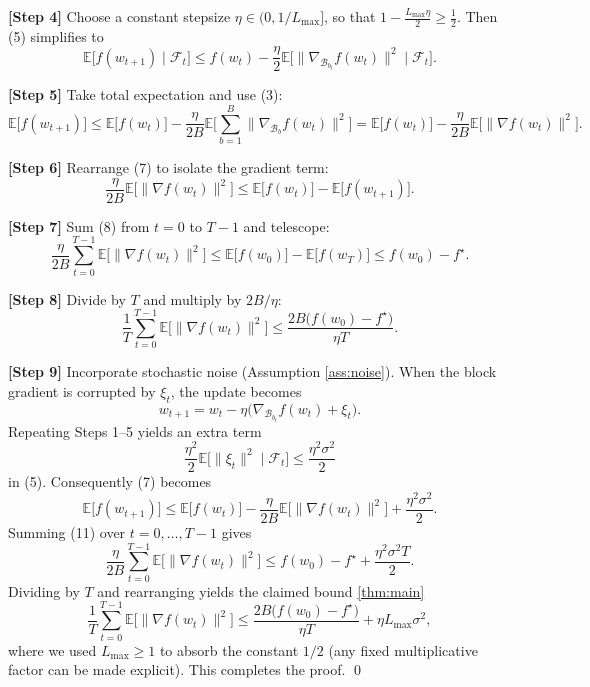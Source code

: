 \documentclass[11pt]{article}
\newcommand{\EE}{\mathbb{E}}
\newcommand{\grad}{\nabla}
\newcommand{\block}[1]{\mathcal{B}_{#1}}
\begin{document}
\noindent\textbf{[Step 4]}  Choose a constant stepsize $\eta\in(0,1/L_{\max}]$,
so that $1-\frac{L_{\max}\eta}{2}\ge\frac12$.  Then (5) simplifies to
\[
\EE\!\big[ f(w_{t+1})\mid\mathcal{F}_t\big]
\le
f(w_t) - \frac{\eta}{2}
\EE\!\big[ \big\|\grad_{\block{b_t}} f(w_t)\big\|^2 \mid \mathcal{F}_t\big].
\tag{6}
\]

\noindent\textbf{[Step 5]}  Take total expectation and use (3):
\[
\EE\!\big[ f(w_{t+1})\big]
\le
\EE\!\big[ f(w_t)\big]
- \frac{\eta}{2B}
\EE\!\big[ \sum_{b=1}^{B}\big\|\grad_{\block{b}} f(w_t)\big\|^2\big]
=
\EE\!\big[ f(w_t)\big]
- \frac{\eta}{2B}
\EE\!\big[ \|\grad f(w_t)\|^2\big].
\tag{7}
\]

\noindent\textbf{[Step 6]}  Rearrange (7) to isolate the gradient term:
\[
\frac{\eta}{2B}\EE\!\big[ \|\grad f(w_t)\|^2\big]
\le
\EE\!\big[ f(w_t)\big] - \EE\!\big[ f(w_{t+1})\big].
\tag{8}
\]

\noindent\textbf{[Step 7]}  Sum (8) from $t=0$ to $T-1$ and telescope:
\[
\frac{\eta}{2B}\sum_{t=0}^{T-1}\EE\!\big[ \|\grad f(w_t)\|^2\big]
\le
\EE\!\big[ f(w_0)\big] - \EE\!\big[ f(w_T)\big]
\le
f(w_0)-f^\star .
\tag{9}
\]

\noindent\textbf{[Step 8]}  Divide by $T$ and multiply by $2B/\eta$:
\[
\frac{1}{T}\sum_{t=0}^{T-1}\EE\!\big[ \|\grad f(w_t)\|^2\big]
\le
\frac{2B\big(f(w_0)-f^\star\big)}{\eta T}.
\tag{10}
\]

\noindent\textbf{[Step 9]}  Incorporate stochastic noise (Assumption \ref{ass:noise}).
When the block gradient is corrupted by $\xi_t$, the update becomes
\[
w_{t+1}=w_t - \eta\big(\grad_{\block{b_t}} f(w_t)+\xi_t\big).
\]
Repeating Steps 1–5 yields an extra term
\[
\frac{\eta^{2}}{2}\EE\!\big[\|\xi_t\|^2\mid\mathcal{F}_t\big]
\le \frac{\eta^{2}\sigma^{2}}{2}
\]
in (5).  Consequently (7) becomes
\[
\EE\!\big[ f(w_{t+1})\big]
\le
\EE\!\big[ f(w_t)\big]
- \frac{\eta}{2B}\EE\!\big[ \|\grad f(w_t)\|^2\big]
+ \frac{\eta^{2}\sigma^{2}}{2}.
\tag{11}
\]
Summing (11) over $t=0,\dots ,T-1$ gives
\[
\frac{\eta}{2B}\sum_{t=0}^{T-1}\EE\!\big[ \|\grad f(w_t)\|^2\big]
\le
f(w_0)-f^\star + \frac{\eta^{2}\sigma^{2}T}{2}.
\tag{12}
\]
Dividing by $T$ and rearranging yields the claimed bound \eqref{thm:main}
\[
\frac{1}{T}\sum_{t=0}^{T-1}\EE\!\big[ \|\grad f(w_t)\|^2\big]
\le
\frac{2B\big(f(w_0)-f^\star\big)}{\eta T}
+ \eta L_{\max}\sigma^{2},
\]
where we used $L_{\max}\ge 1$ to absorb the constant $1/2$ (any fixed
multiplicative factor can be made explicit).  This completes the proof. \qed
\end{document}
